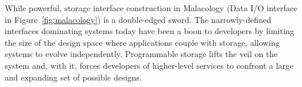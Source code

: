 While powerful, storage interface construction in Malacology (Data I/O interface in
Figure~\ref{fig:malacology}) is a double-edged
sword. The narrowly-defined interfaces dominating systems today have been a
boon to developers by limiting the size of the design space where applications
couple with storage, allowing systems to evolve independently. Programmable
storage lifts the veil on the system and, with it, forces developers of
higher-level services to confront a large and expanding set of possible
designs.
